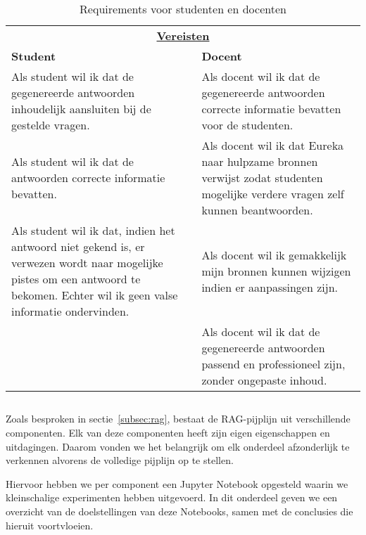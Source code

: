 \begin{table}[ht]
    \small 
    \centering
    \begin{tabular}{p{7.5cm} p{7.5cm}}
        \multicolumn{2}{c}{\uline{\textbf{Vereisten}}} \\
        \addlinespace[0.5ex]
        \textbf{Student} & \textbf{Docent} \\
        \midrule
        Als student wil ik dat de gegenereerde antwoorden inhoudelijk aansluiten bij de gestelde vragen. &
        Als docent wil ik dat de gegenereerde antwoorden correcte informatie bevatten voor de studenten. \\
        Als student wil ik dat de antwoorden correcte informatie bevatten. &
        Als docent wil ik dat Eureka naar hulpzame bronnen verwijst zodat studenten mogelijke verdere vragen zelf kunnen beantwoorden. \\
        Als student wil ik dat, indien het antwoord niet gekend is, er verwezen wordt naar mogelijke pistes om een antwoord te bekomen. Echter wil ik geen valse informatie ondervinden. &
        Als docent wil ik gemakkelijk mijn bronnen kunnen wijzigen indien er aanpassingen zijn. \\
        & Als docent wil ik dat de gegenereerde antwoorden passend en professioneel zijn, zonder ongepaste inhoud. \\
        \bottomrule
    \end{tabular}
    \caption{Requirements voor studenten en docenten}
    \label{tab:requirements}
\end{table}

\subsection{}%
\label{subsec:verkenning-onderdelen}

Zoals besproken in sectie~\ref{subsec:rag}, bestaat de RAG-pijplijn uit verschillende componenten. Elk van deze componenten heeft zijn eigen eigenschappen en uitdagingen. Daarom vonden we het belangrijk om elk onderdeel afzonderlijk te verkennen alvorens de volledige pijplijn op te stellen.

Hiervoor hebben we per component een Jupyter Notebook opgesteld waarin we kleinschalige experimenten hebben uitgevoerd. In dit onderdeel geven we een overzicht van de doelstellingen van deze Notebooks, samen met de conclusies die hieruit voortvloeien.

